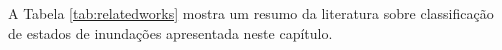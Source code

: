A Tabela \ref{tab:relatedworks} mostra um resumo da literatura sobre classificação de estados de inundações apresentada neste capítulo.


